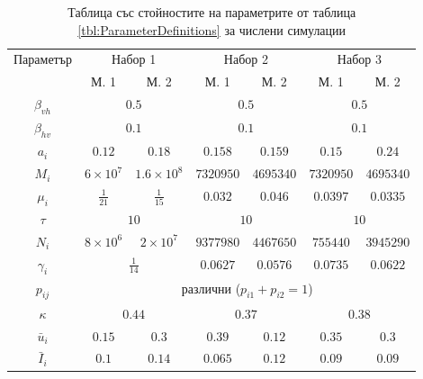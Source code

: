   \begin{table}[h]
    \centering
    \begin{tabular}{ |c ||c c c c c c|  }
      \hline
      \multirow{2}{*}{Параметър}& \multicolumn{2}{c}{Набор 1}& \multicolumn{2}{c}{Набор 2} & \multicolumn{2}{c|}{Набор 3}\\
      & М. 1 & М. 2 & М. 1 & М. 2 & М. 1 & М. 2\\
      \hline
      $\beta_{vh}$ & \multicolumn{2}{c}{$0.5$} & \multicolumn{2}{c}{$0.5$}  & \multicolumn{2}{c|}{$0.5$}\\
      $\beta_{hv}$ & \multicolumn{2}{c}{$0.1$} & \multicolumn{2}{c}{$0.1$} & \multicolumn{2}{c|}{$0.1$}\\
      $a_i$ & $0.12$ & $0.18$ & $0.158$ & $0.159$ & $0.15$ & $0.24$\\
      $M_i$ & $6 \times 10^7$ & $1.6 \times 10^8$ & $7320950$ & $4695340$ & $7320950$ & $4695340$\\
      $\mu_i$ & $\frac{1}{21}$ & $\frac{1}{15}$ & $0.032$ & $0.046$ & $0.0397$ & $0.0335$\\
      $\tau$ & \multicolumn{2}{c}{$10$} & \multicolumn{2}{c}{$10$} & \multicolumn{2}{c|}{$10$}\\
      $N_i$ & $8 \times 10^6$ & $2 \times 10^7$ & $9377980$ & $4467650$ & $755440$ & $3945290$\\
      $\gamma_i$ & \multicolumn{2}{c}{$\frac{1}{14}$} & $0.0627$ & $0.0576$ & $0.0735$ & $0.0622$\\
      $p_{ij}$ & \multicolumn{6}{c|}{различни ($p_{i1}+p_{i2}=1$)}\\
      $\kappa$ & \multicolumn{2}{c}{$0.44$} & \multicolumn{2}{c}{$0.37$} & \multicolumn{2}{c|}{$0.38$}\\
      $\bar{u}_i$ & $0.15$ & $0.3$ & $0.39$ & $0.12$ & $0.35$ & $0.3$\\
      $\bar{I}_i$ & $0.1$ & $0.14$ & $0.065$ & $0.12$ & $0.09$ & $0.09$\\
      \hline
    \end{tabular}
    \caption{Таблица със стойностите на параметрите от таблица \ref{tbl:ParameterDefinitions} за числени симулации}
    \label{tbl:ParameterValues}
  \end{table}

